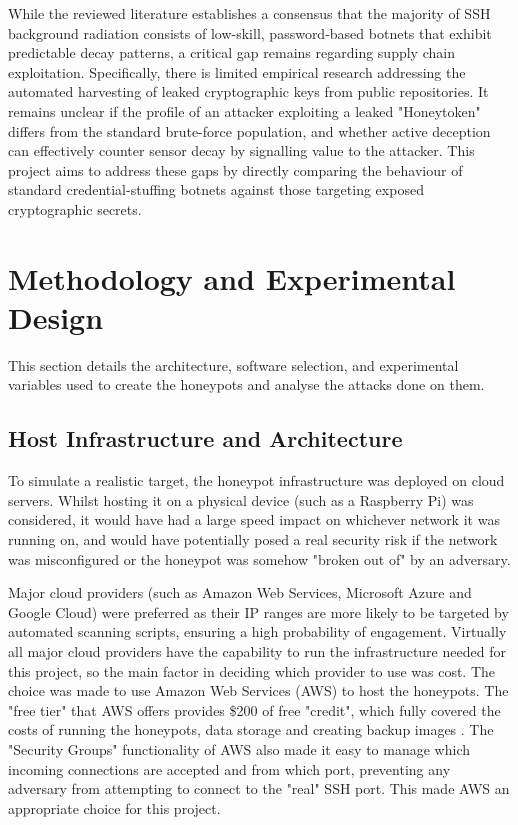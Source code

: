\documentclass[]{article}
\begin{document}
While the reviewed literature establishes a consensus that the majority of SSH background radiation consists of low-skill, password-based botnets that exhibit predictable decay patterns, a critical gap remains regarding supply chain exploitation. Specifically, there is limited empirical research addressing the automated harvesting of leaked cryptographic keys from public repositories. It remains unclear if the profile of an attacker exploiting a leaked "Honeytoken" differs from the standard brute-force population, and whether active deception can effectively counter sensor decay by signalling value to the attacker. This project aims to address these gaps by directly comparing the behaviour of standard credential-stuffing botnets against those targeting exposed cryptographic secrets.

\section{Methodology and Experimental Design}

This section details the architecture, software selection, and experimental variables used to create the honeypots and analyse the attacks done on them.

\subsection{Host Infrastructure and Architecture}

To simulate a realistic target, the honeypot infrastructure was deployed on cloud servers. Whilst hosting it on a physical device (such as a Raspberry Pi) was considered, it would have had a large speed impact on whichever network it was running on, and would have potentially posed a real security risk if the network was misconfigured or the honeypot was somehow "broken out of" by an adversary.

Major cloud providers (such as Amazon Web Services, Microsoft Azure and Google Cloud) were preferred as their IP ranges are more likely to be targeted by automated scanning scripts, ensuring a high probability of engagement. Virtually all major cloud providers have the capability to run the infrastructure needed for this project, so the main factor in deciding which provider to use was cost. The choice was made to use Amazon Web Services (AWS) to host the honeypots. The "free tier" that AWS offers provides \$200 of free "credit", which fully covered the costs of running the honeypots, data storage and creating backup images \cite{awsfreetier}. The "Security Groups" functionality of AWS also made it easy to manage which incoming connections are accepted and from which port, preventing any adversary from attempting to connect to the "real" SSH port. This made AWS an appropriate choice for this project.
\end{document}
